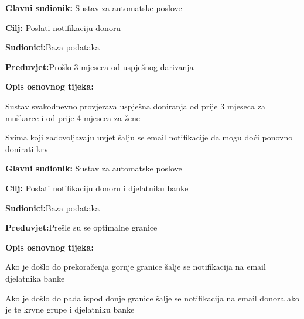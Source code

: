 \begin{packed_item}
	
	\item \textbf{Glavni sudionik: }{Sustav za automatske poslove}
	\item  \textbf{Cilj:} {Poslati notifikaciju donoru}
	\item  \textbf{Sudionici:}{Baza podataka}
	\item  \textbf{Preduvjet:}{Prošlo 3 mjeseca od uspješnog darivanja}
	\item  \textbf{Opis osnovnog tijeka:}
	
	\item[] \begin{packed_enum}
		
		\item {Sustav svakodnevno provjerava uspješna doniranja od prije 3 mjeseca za muškarce i od prije 4 mjeseca za žene}
		\item {Svima koji zadovoljavaju uvjet šalju se email notifikacije da mogu doći ponovno donirati krv}
		
	\end{packed_enum}
	
\end{packed_item}

\noindent {}
\begin{packed_item}
	
	\item \textbf{Glavni sudionik: }{Sustav za automatske poslove}
	\item  \textbf{Cilj:} {Poslati notifikaciju donoru i djelatniku banke}
	\item  \textbf{Sudionici:}{Baza podataka}
	\item  \textbf{Preduvjet:}{Prešle su se optimalne granice}
	\item  \textbf{Opis osnovnog tijeka:}
	
	\item[] \begin{packed_enum}
		
		\item {Ako je došlo do prekoračenja gornje granice šalje se notifikacija na email djelatnika banke}
		\item {Ako je došlo do pada ispod donje granice šalje se notifikacija na email donora ako je te krvne grupe i djelatniku banke}
		
		
	\end{packed_enum}
	
\end{packed_item}


